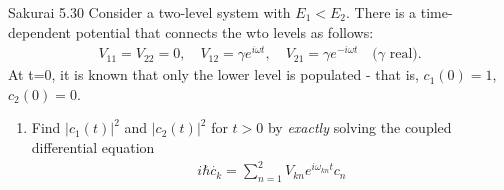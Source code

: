 \documentclass{article}
\begin{document}
\newpage
\begin{section}{Sakurai 5.30}
Consider a two-level system with $E_1 < E_2$. There is a time-dependent potential that connects the wto levels as follows:
\begin{align*}
	V_{11} = V_{22} = 0, \quad V_{12} = \gamma e^{i \omega t}, \quad V_{21} = \gamma e^{-i \omega t} \quad \text{($\gamma$ real).}
\end{align*}
At t=0, it is known that only the lower level is populated - that is, $c_1(0) = 1$, $c_2(0) = 0$.

\begin{enumerate}
	\item Find $|c_1(t)|^2$ and $|c_2(t)|^2$ for $t > 0$ by {\it exactly} solving the coupled differential equation
	\begin{align*}
		i\hbar \dot{c_k} = \sum_{n=1}^2 V_{kn} e^{i \omega_{kn} t} c_n
	\end{align*}


\end{enumerate}
\end{section}
\end{document}
